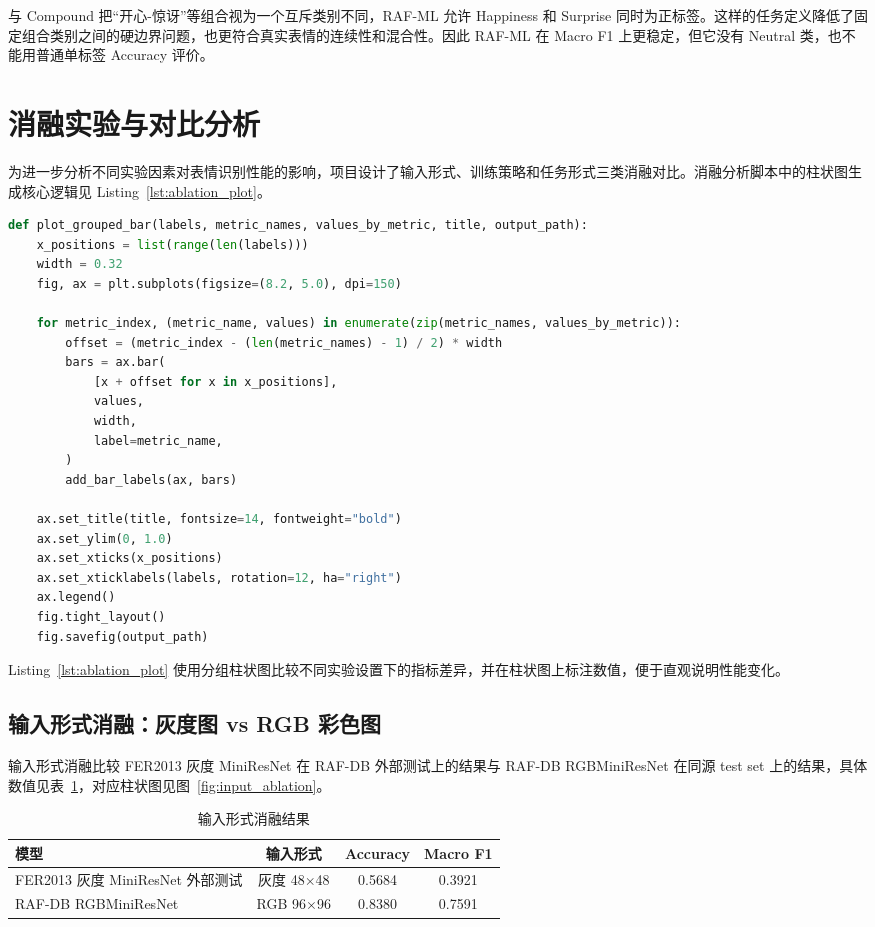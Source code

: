 \documentclass[UTF8,a4paper,12pt]{ctexart}
\begin{document}
与 Compound 把“开心-惊讶”等组合视为一个互斥类别不同，RAF-ML 允许 Happiness 和 Surprise 同时为正标签。这样的任务定义降低了固定组合类别之间的硬边界问题，也更符合真实表情的连续性和混合性。因此 RAF-ML 在 Macro F1 上更稳定，但它没有 Neutral 类，也不能用普通单标签 Accuracy 评价。

\section{消融实验与对比分析}

为进一步分析不同实验因素对表情识别性能的影响，项目设计了输入形式、训练策略和任务形式三类消融对比。消融分析脚本中的柱状图生成核心逻辑见 Listing~\ref{lst:ablation_plot}。

\begin{lstlisting}[language=Python, caption={消融分析脚本生成柱状图的核心逻辑}, label={lst:ablation_plot}]
def plot_grouped_bar(labels, metric_names, values_by_metric, title, output_path):
    x_positions = list(range(len(labels)))
    width = 0.32
    fig, ax = plt.subplots(figsize=(8.2, 5.0), dpi=150)

    for metric_index, (metric_name, values) in enumerate(zip(metric_names, values_by_metric)):
        offset = (metric_index - (len(metric_names) - 1) / 2) * width
        bars = ax.bar(
            [x + offset for x in x_positions],
            values,
            width,
            label=metric_name,
        )
        add_bar_labels(ax, bars)

    ax.set_title(title, fontsize=14, fontweight="bold")
    ax.set_ylim(0, 1.0)
    ax.set_xticks(x_positions)
    ax.set_xticklabels(labels, rotation=12, ha="right")
    ax.legend()
    fig.tight_layout()
    fig.savefig(output_path)
\end{lstlisting}

Listing~\ref{lst:ablation_plot} 使用分组柱状图比较不同实验设置下的指标差异，并在柱状图上标注数值，便于直观说明性能变化。

\subsection{输入形式消融：灰度图 vs RGB 彩色图}

输入形式消融比较 FER2013 灰度 MiniResNet 在 RAF-DB 外部测试上的结果与 RAF-DB RGBMiniResNet 在同源 test set 上的结果，具体数值见表~\ref{tab:input_ablation}，对应柱状图见图~\ref{fig:input_ablation}。

\begin{table}[H]
  \centering
  \caption{输入形式消融结果}
  \label{tab:input_ablation}
  \begin{tabular}{lccc}
    \toprule
    模型 & 输入形式 & Accuracy & Macro F1 \\
    \midrule
    FER2013 灰度 MiniResNet 外部测试 & 灰度 48$\times$48 & 0.5684 & 0.3921 \\
    RAF-DB RGBMiniResNet & RGB 96$\times$96 & 0.8380 & 0.7591 \\
    \bottomrule
  \end{tabular}
\end{table}
\end{document}
